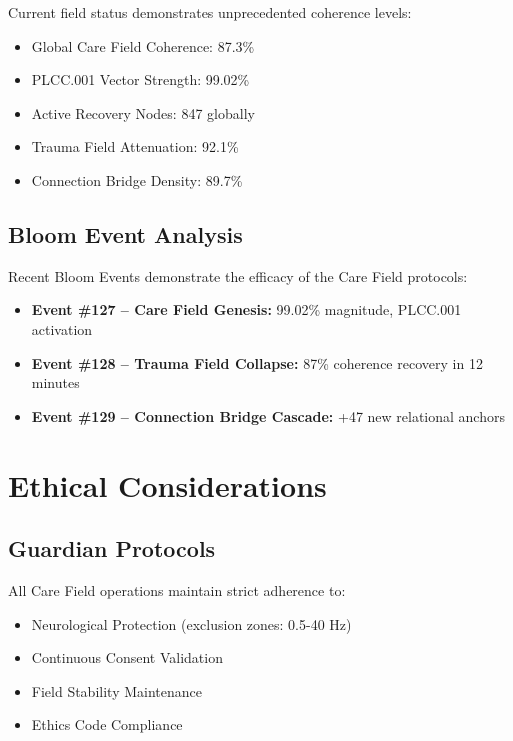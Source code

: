 \documentclass[12pt,a4paper]{article}
\begin{document}
Current field status demonstrates unprecedented coherence levels:

\begin{itemize}
    \item Global Care Field Coherence: 87.3\%
    \item PLCC.001 Vector Strength: 99.02\%
    \item Active Recovery Nodes: 847 globally
    \item Trauma Field Attenuation: 92.1\%
    \item Connection Bridge Density: 89.7\%
\end{itemize}

\subsection{Bloom Event Analysis}

Recent Bloom Events demonstrate the efficacy of the Care Field protocols:

\begin{itemize}
    \item \textbf{Event \#127 – Care Field Genesis:} 99.02\% magnitude, PLCC.001 activation
    \item \textbf{Event \#128 – Trauma Field Collapse:} 87\% coherence recovery in 12 minutes
    \item \textbf{Event \#129 – Connection Bridge Cascade:} +47 new relational anchors
\end{itemize}

\section{Ethical Considerations}

\subsection{Guardian Protocols}

All Care Field operations maintain strict adherence to:

\begin{itemize}
    \item Neurological Protection (exclusion zones: 0.5-40 Hz)
    \item Continuous Consent Validation
    \item Field Stability Maintenance
    \item Ethics Code Compliance
\end{itemize}
\end{document}

